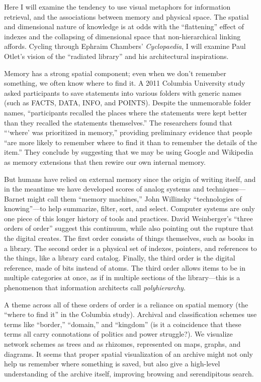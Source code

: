 Here I will examine the tendency to use visual metaphors for information retrieval, and the associations between memory and physical space. The spatial and dimensional nature of knowledge is at odds with the ``flattening'' effect of indexes and the collapsing of dimensional space that non-hierarchical linking affords. Cycling through Ephraim Chambers' \emph{Cyclopaedia}, I will examine Paul Otlet's vision of the ``radiated library'' and his architectural inspirations.

Memory has a strong spatial component; even when we don't remember something, we often know where to find it. A 2011 Columbia University study asked participants to save statements into various folders with generic names (such as FACTS, DATA, INFO, and POINTS). Despite the unmemorable folder names, ``participants recalled the places where the statements were kept better than they recalled the statements themselves.'' The researchers found that ``\thinspace `where' was prioritized in memory,'' providing preliminary evidence that people ``are more likely to remember where to find it than to remember the details of the item.''\autocite{sparrow_google_2011} They conclude by suggesting that we may be using Google and Wikipedia as memory extensions that then rewire our own internal memory.

But humans have relied on external memory since the origin of writing itself, and in the meantime we have developed scores of analog systems and techniques---Barnet might call them ``memory machines,'' John Willinsky ``technologies of knowing''---to help summarize, filter, sort, and select. Computer systems are only one piece of this longer history of tools and practices. David Weinberger's ``three orders of order'' suggest this continuum, while also pointing out the rupture that the digital creates. The first order consists of things themselves, such as books in a library. The second order is a physical set of indexes, pointers, and references to the things, like a library card catalog. Finally, the third order is the digital reference, made of bits instead of atoms.\autocite[17-23]{weinberger_everything_2008} The third order allows items to be in multiple categories at once, as if in multiple sections of the library---this is a phenomenon that information architects call \emph{polyhierarchy}.

A theme across all of these orders of order is a reliance on spatial memory (the ``where to find it'' in the Columbia study). Archival and classification schemes use terms like ``border,'' ``domain,'' and ``kingdom'' (is it a coincidence that these terms all carry connotations of politics and power struggle?). We visualize network schemes as trees and as rhizomes, represented on maps, graphs, and diagrams. It seems that proper spatial visualization of an archive might not only help us remember where something is saved, but also give a high-level understanding of the archive itself, improving browsing and serendipitous search.

